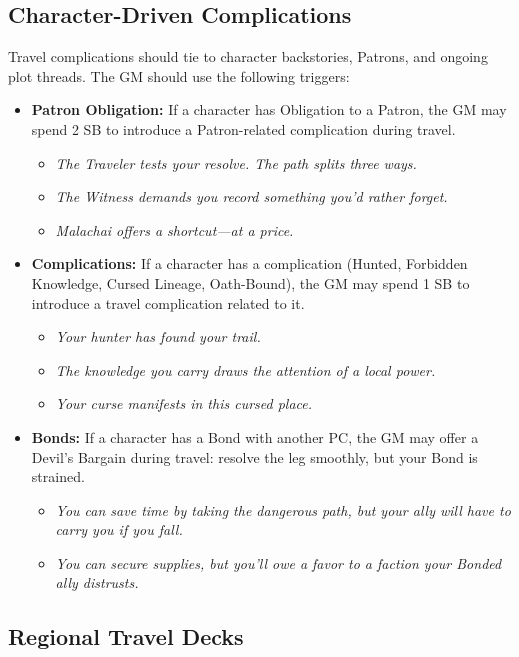 \subsection*{Character-Driven Complications}
\label{sec:character-complications}

Travel complications should tie to character backstories, Patrons, and ongoing plot threads. The GM should use the following triggers:

\begin{itemize}
\item \textbf{Patron Obligation:} If a character has Obligation to a Patron, the GM may spend 2 SB to introduce a Patron-related complication during travel.
  \begin{itemize}
  \item \textit{The Traveler tests your resolve. The path splits three ways.}
  \item \textit{The Witness demands you record something you'd rather forget.}
  \item \textit{Malachai offers a shortcut—at a price.}
  \end{itemize}
\item \textbf{Complications:} If a character has a complication (Hunted, Forbidden Knowledge, Cursed Lineage, Oath-Bound), the GM may spend 1 SB to introduce a travel complication related to it.
  \begin{itemize}
  \item \textit{Your hunter has found your trail.}
  \item \textit{The knowledge you carry draws the attention of a local power.}
  \item \textit{Your curse manifests in this cursed place.}
  \end{itemize}
\item \textbf{Bonds:} If a character has a Bond with another PC, the GM may offer a Devil's Bargain during travel: resolve the leg smoothly, but your Bond is strained.
  \begin{itemize}
  \item \textit{You can save time by taking the dangerous path, but your ally will have to carry you if you fall.}
  \item \textit{You can secure supplies, but you'll owe a favor to a faction your Bonded ally distrusts.}
  \end{itemize}
\end{itemize}

\subsection*{Regional Travel Decks}
\label{sec:travel-decks}

